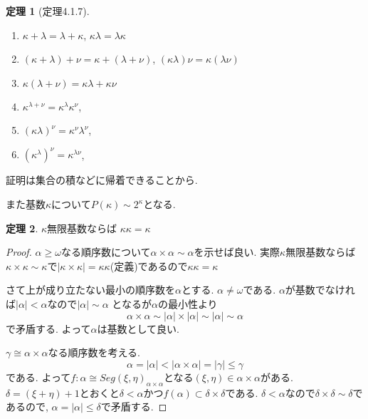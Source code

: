 \documentclass[dvipdfmx,a4paper,11pt]{report}
\theoremstyle{definition}
\newtheorem{thm}{定理}
\begin{document}
 \begin{tcolorbox}
 [colback = white, colframe = green!35!black, fonttitle = \bfseries,breakable = true]
\begin{thm}[定理4.1.7]
\begin{enumerate}
\item $\kappa + \lambda = \lambda + \kappa$, $\kappa \lambda = \lambda \kappa$
\item $(\kappa + \lambda) +\nu  = \kappa  + (\lambda + \nu)$, $(\kappa \lambda)\nu  = \kappa(\lambda   \nu)$
\item $\kappa  (\lambda + \nu) = \kappa  \lambda + \kappa \nu$
\item $\kappa^{\lambda + \nu} = \kappa ^\lambda  \kappa^\nu$, 
\item $(\kappa\lambda)^\nu = \kappa ^\nu  \lambda^\nu$, 
\item $(\kappa^\lambda)^\nu = \kappa ^{ \lambda \nu}$, 
\end{enumerate}
\end{thm}
\end{tcolorbox}
証明は集合の積などに帰着できることから. 

また基数$\kappa$について$P(\kappa) \sim 2^{\kappa}$となる. 

 \begin{tcolorbox}
 [colback = white, colframe = green!35!black, fonttitle = \bfseries,breakable = true]
\begin{thm}
$\kappa$無限基数ならば
$\kappa\kappa = \kappa$
\end{thm}
\end{tcolorbox}
\begin{proof}
$\alpha \ge \omega$なる順序数について$\alpha \times \alpha \sim \alpha$を示せば良い.
実際$\kappa$無限基数ならば
$\kappa \times \kappa \sim \kappa$で$|\kappa \times \kappa|=\kappa\kappa$(定義)であるので$\kappa\kappa = \kappa$

さて上が成り立たない最小の順序数を$\alpha$とする.
$\alpha \neq \omega$である.
$\alpha$が基数でなければ$|\alpha| < \alpha$なので$|\alpha| \sim \alpha$
となるが$\alpha$の最小性より
$$
\alpha \times \alpha \sim |\alpha|\times |\alpha| \sim |\alpha|\sim \alpha
$$
で矛盾する.
よって$\alpha$は基数として良い. 

$\gamma \cong \alpha \times \alpha$なる順序数を考える. 
$$
\alpha =|\alpha| < |\alpha \times \alpha | = |\gamma| \le \gamma
$$である. 
よって$f: \alpha \cong Seg(\xi,\eta)_{\alpha \times \alpha}$となる$(\xi,\eta) \in \alpha \times \alpha $がある. 
$\delta = (\xi+\eta) +1$とおくと$\delta<\alpha$かつ$f(\alpha) \subset \delta \times \delta $である. $\delta < \alpha$なので$\delta \times \delta \sim \delta$であるので, 
$\alpha =|\alpha| \le \delta$で矛盾する. 
\end{proof}
\end{document}
